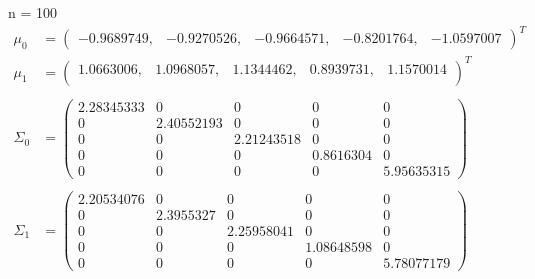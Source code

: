 \documentclass[12pt]{article}
\begin{document}
\begin{enumerate}[leftmargin=*]
    n = 100
    \begin{align*}
        \mu_0 &= \begin{pmatrix}
            -0.9689749, & -0.9270526, & -0.9664571, & -0.8201764, & -1.0597007
        \end{pmatrix}^T \\
        \mu_1 &= \begin{pmatrix}
            1.0663006, & 1.0968057, & 1.1344462, & 0.8939731, & 1.1570014 \\
        \end{pmatrix}^T \\ \\
        \Sigma_0 &= \begin{pmatrix}
            2.28345333 & 0 & 0 & 0 & 0 \\
            0 & 2.40552193 & 0 & 0 & 0 \\
            0 & 0 & 2.21243518 & 0 & 0 \\
            0 & 0 & 0 & 0.8616304 & 0 \\
            0 & 0 & 0 & 0 & 5.95635315 
        \end{pmatrix} \\ \\
        \Sigma_1 &= \begin{pmatrix}
            2.20534076 & 0 & 0 & 0 & 0 \\
            0 & 2.3955327 & 0 & 0 & 0 \\
            0 & 0 & 2.25958041 & 0 & 0 \\
            0 & 0 & 0 & 1.08648598 & 0 \\
            0 & 0 & 0 & 0 & 5.78077179
        \end{pmatrix}
    \end{align*}


\end{enumerate}
\end{document}
